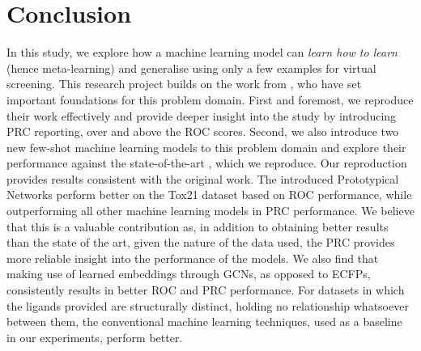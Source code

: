 \section{Conclusion}

In this study, we explore how a machine learning model can \textit{learn how to learn} (hence meta-learning) and generalise using only a few examples for virtual screening. This research project builds on the work from \citet{altae2017low}, who have set important foundations for this problem domain. First and foremost, we reproduce their work effectively and provide deeper insight into the study by introducing PRC reporting, over and above the ROC scores. Second, we also introduce two new few-shot machine learning models to this problem domain and explore their performance against the state-of-the-art \cite{altae2017low}, which we reproduce. Our reproduction provides results consistent with the original work. The introduced Prototypical Networks perform better on the Tox21 dataset based on ROC performance, while outperforming all other machine learning models in PRC performance. We believe that this is a valuable contribution as, in addition to obtaining better results than the state of the art, given the nature of the data used, the PRC provides more reliable insight into the performance of the models. We also find that making use of learned embeddings through GCNs, as opposed to ECFPs, consistently results in better ROC and PRC performance. For datasets in which the ligands provided are structurally distinct, holding no relationship whatsoever between them, the conventional machine learning techniques, used as a baseline in our experiments, perform better.
